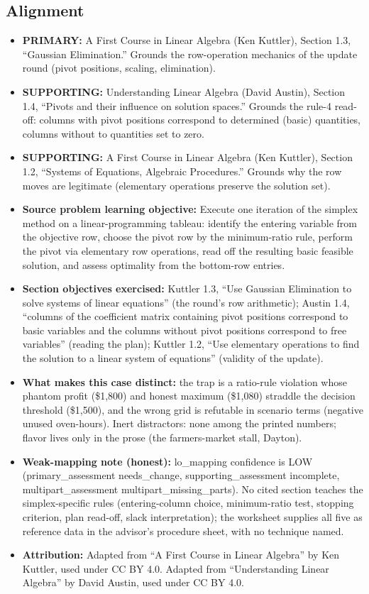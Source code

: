 \documentclass[11pt]{article}
\begin{document}
\subsection*{Alignment}
\begin{itemize}[leftmargin=*, itemsep=2pt, topsep=3pt]
\item \textbf{PRIMARY:} A First Course in Linear Algebra (Ken Kuttler), Section 1.3,
``Gaussian Elimination.'' Grounds the row-operation mechanics of the update round
(pivot positions, scaling, elimination).
\item \textbf{SUPPORTING:} Understanding Linear Algebra (David Austin), Section 1.4,
``Pivots and their influence on solution spaces.'' Grounds the rule-4 read-off: columns
with pivot positions correspond to determined (basic) quantities, columns without to
quantities set to zero.
\item \textbf{SUPPORTING:} A First Course in Linear Algebra (Ken Kuttler), Section 1.2,
``Systems of Equations, Algebraic Procedures.'' Grounds why the row moves are legitimate
(elementary operations preserve the solution set).
\item \textbf{Source problem learning objective:} Execute one iteration of the simplex
method on a linear-programming tableau: identify the entering variable from the objective
row, choose the pivot row by the minimum-ratio rule, perform the pivot via elementary row
operations, read off the resulting basic feasible solution, and assess optimality from
the bottom-row entries.
\item \textbf{Section objectives exercised:} Kuttler 1.3, ``Use Gaussian Elimination to
solve systems of linear equations'' (the round's row arithmetic); Austin 1.4, ``columns
of the coefficient matrix containing pivot positions correspond to basic variables and
the columns without pivot positions correspond to free variables'' (reading the plan);
Kuttler 1.2, ``Use elementary operations to find the solution to a linear system of
equations'' (validity of the update).
\item \textbf{What makes this case distinct:} the trap is a ratio-rule violation whose
phantom profit (\$1{,}800) and honest maximum (\$1{,}080) straddle the decision threshold
(\$1{,}500), and the wrong grid is refutable in scenario terms (negative unused
oven-hours). Inert distractors: none among the printed numbers; flavor lives only in the
prose (the farmers-market stall, Dayton).
\item \textbf{Weak-mapping note (honest):} lo\_mapping confidence is LOW
(primary\_assessment needs\_change, supporting\_assessment incomplete,
multipart\_assessment multipart\_missing\_parts). No cited section teaches the
simplex-specific rules (entering-column choice, minimum-ratio test, stopping criterion,
plan read-off, slack interpretation); the worksheet supplies all five as reference data
in the advisor's procedure sheet, with no technique named.
\item \textbf{Attribution:} Adapted from ``A First Course in Linear Algebra'' by Ken
Kuttler, used under CC BY 4.0. Adapted from ``Understanding Linear Algebra'' by David
Austin, used under CC BY 4.0.
\end{itemize}
\end{document}
